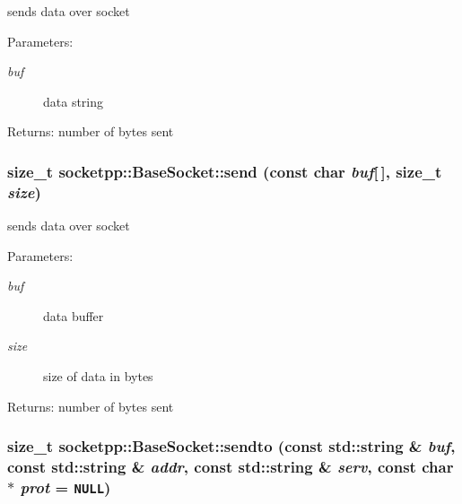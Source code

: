 sends data over socket 

\begin{Desc}
\item[Parameters:]
\begin{description}
\item[{\em buf}]data string \end{description}
\end{Desc}
\begin{Desc}
\item[Returns:]number of bytes sent \end{Desc}
\hypertarget{classsocketpp_1_1BaseSocket_bf4e15b88271e34e606b9b2a5b384b5b}{
\subsubsection[{send}]{\setlength{\rightskip}{0pt plus 5cm}size\_\-t socketpp::BaseSocket::send (const char {\em buf}\mbox{[}$\,$\mbox{]}, \/  size\_\-t {\em size})}}
\label{classsocketpp_1_1BaseSocket_bf4e15b88271e34e606b9b2a5b384b5b}


sends data over socket 

\begin{Desc}
\item[Parameters:]
\begin{description}
\item[{\em buf}]data buffer \item[{\em size}]size of data in bytes \end{description}
\end{Desc}
\begin{Desc}
\item[Returns:]number of bytes sent \end{Desc}
\hypertarget{classsocketpp_1_1BaseSocket_5fd9737270ee71d2292e70ed625d63f9}{
\subsubsection[{sendto}]{\setlength{\rightskip}{0pt plus 5cm}size\_\-t socketpp::BaseSocket::sendto (const std::string \& {\em buf}, \/  const std::string \& {\em addr}, \/  const std::string \& {\em serv}, \/  const char $\ast$ {\em prot} = {\tt NULL})}}
\label{classsocketpp_1_1BaseSocket_5fd9737270ee71d2292e70ed625d63f9}



